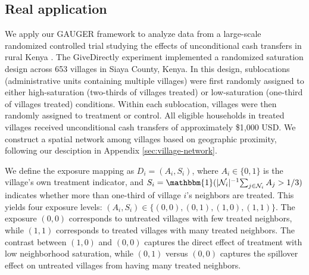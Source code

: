 \documentclass{article}
\theoremstyle{plain}
\theoremstyle{definition}
\theoremstyle{remark}
\newcommand{\cN}{\mathcal{N}}
\newcommand{\indicator}{\mathbbm{1}}
\begin{document}


\subsection{Real application}
\label{sec:application}

We apply our GAUGER framework to analyze data from a large-scale randomized controlled trial studying the effects of unconditional cash transfers in rural Kenya \citep{egger2022general}. The GiveDirectly experiment implemented a randomized saturation design across 653 villages in Siaya County, Kenya. In this design, sublocations (administrative units containing multiple villages) were first randomly assigned to either high-saturation (two-thirds of villages treated) or low-saturation (one-third of villages treated) conditions. Within each sublocation, villages were then randomly assigned to treatment or control. All eligible households in treated villages received unconditional cash transfers of approximately \$1,000 USD. We construct a spatial network among villages based on geographic proximity, following our desciption in Appendix \ref{sec:village-network}.

We define the exposure mapping as $D_i = (A_i, S_i)$, where $A_i \in \{0, 1\}$ is the village's own treatment indicator, and $S_i = \indicator({|\cN_i|^{-1}}{\sum_{j \in \cN_i} A_j} > {1}/{3})$ indicates whether more than one-third of village $i$'s neighbors are treated. This yields four exposure levels: $(A_i, S_i) \in \{(0,0), (0,1), (1,0), (1,1)\}$. The exposure $(0,0)$ corresponds to untreated villages with few treated neighbors, while $(1,1)$ corresponds to treated villages with many treated neighbors. The contrast between $(1,0)$ and $(0,0)$ captures the direct effect of treatment with low neighborhood saturation, while $(0,1)$ versus $(0,0)$ captures the spillover effect on untreated villages from having many treated neighbors.
\end{document}
